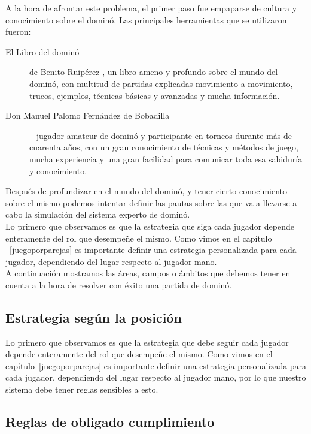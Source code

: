 A la hora de afrontar este problema, el primer paso fue empaparse de cultura y conocimiento sobre el dominó. Las
principales herramientas que se utilizaron fueron:

\begin{description}
    \item[El Libro del dominó] de Benito Ruipérez \cite{mora90}, un libro ameno y profundo sobre el mundo del dominó,
        con multitud de partidas explicadas movimiento a movimiento, trucos, ejemplos, técnicas básicas y avanzadas y
        mucha información.
    \item[Don Manuel Palomo Fernández de Bobadilla] -- jugador amateur de dominó y participante en torneos durante más de cuarenta
        años, con un gran conocimiento de técnicas y métodos de juego, mucha experiencia y una gran facilidad para
        comunicar toda esa sabiduría y conocimiento.
\end{description}

Después de profundizar en el mundo del dominó, y tener cierto conocimiento sobre el mismo podemos intentar definir las pautas sobre
las que va a llevarse a cabo la simulación del sistema experto de dominó. \\

Lo primero que observamos es que la estrategia que siga cada jugador depende enteramente del rol que desempeñe el mismo.
Como vimos en el capítulo ~\ref{juegoporparejas} es importante definir una estrategia personalizada para cada jugador,
dependiendo del lugar respecto al jugador mano. \\

A continuación mostramos las áreas, campos o ámbitos que debemos tener en cuenta a la hora de resolver con éxito
una partida de dominó.

\subsection{Estrategia según la posición}

Lo primero que observamos es que la estrategia que debe seguir cada jugador depende enteramente del rol que desempeñe el mismo.
Como vimos en el capítulo~\ref{juegoporparejas} es importante definir una estrategia personalizada para cada jugador,
dependiendo del lugar respecto al jugador mano, por lo que nuestro sistema debe tener reglas sensibles a esto.

\subsection{Reglas de obligado cumplimiento}

